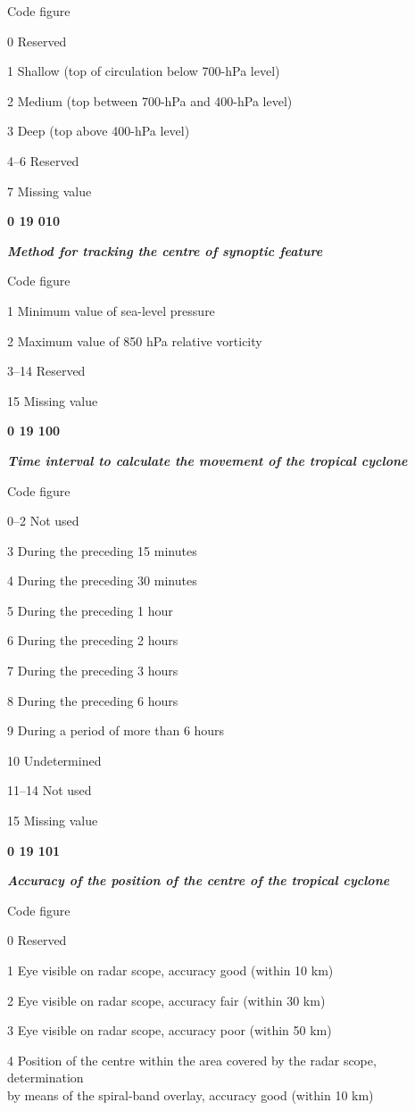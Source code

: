 Code figure

0 Reserved

1 Shallow (top of circulation below 700-hPa level)

2 Medium (top between 700-hPa and 400-hPa level)

3 Deep (top above 400-hPa level)

4--6 Reserved

7 Missing value

\textbf{0 19 010}

\emph{\textbf{Method for tracking the centre of synoptic feature}}

Code figure

1 Minimum value of sea-level pressure

2 Maximum value of 850 hPa relative vorticity

3--14 Reserved

15 Missing value

\textbf{0 19 100}

\emph{\textbf{Time interval to calculate the movement of the tropical cyclone}}

Code figure

0--2 Not used

3 During the preceding 15 minutes

4 During the preceding 30 minutes

5 During the preceding 1 hour

6 During the preceding 2 hours

7 During the preceding 3 hours

8 During the preceding 6 hours

9 During a period of more than 6 hours

10 Undetermined

11--14 Not used

15 Missing value

\textbf{0 19 101}

\emph{\textbf{Accuracy of the position of the centre of the tropical cyclone}}

Code figure

0 Reserved

1 Eye visible on radar scope, accuracy good (within 10 km)

2 Eye visible on radar scope, accuracy fair (within 30 km)

3 Eye visible on radar scope, accuracy poor (within 50 km)

4 Position of the centre within the area covered by the radar scope, determination\\
by means of the spiral-band overlay, accuracy good (within 10 km)

